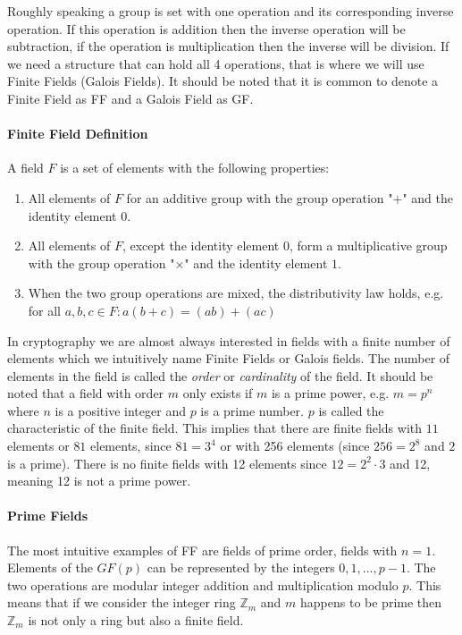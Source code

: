 Roughly speaking a group is set with one operation and its corresponding inverse operation. If this operation is addition then the inverse operation will be subtraction, if the operation is multiplication then the inverse will be division. If we need a structure that can hold all 4 operations, that is where we will use Finite Fields (Galois Fields). It should be noted that it is common to denote a Finite Field as FF and a Galois Field as GF. 

\paragraph{Finite Field Definition}

A field $F$ is a set of elements with the following properties:

\begin{enumerate}
\item{All elements of $F$ for an additive group with the group operation "$+$" and the identity element $0$.}
\item{All elements of $F$, except the identity element $0$, form a multiplicative group with the group operation "$\times$" and the identity element $1$.}
\item{When the two group operations are mixed, the distributivity law holds, e.g. for all $a,b,c \in F : a(b + c) = (ab) + (ac)$} 
\end{enumerate}

In cryptography we are almost always interested in fields with a finite number of elements which we intuitively name Finite Fields or Galois fields. The number of elements in the field is called the \textit{order} or \textit{cardinality} of the field. It should be noted that a field with order $m$ only exists if $m$ is a prime power, e.g. $m = p^n$ where $n$ is a positive integer and $p$ is a prime number. $p$ is called the characteristic of the finite field. This implies that there are finite fields with $11$ elements or $81$ elements, since $81 = 3^4$ or with 256 elements (since $256 = 2^8$ and $2$ is a prime). There is no finite fields with 12 elements since $12 = 2^2 \cdot 3$ and 12, meaning 12 is not a prime power.

\paragraph{Prime Fields}

The most intuitive examples of FF are fields of prime order, fields with $n=1$. Elements of the $GF(p)$ can be represented by the integers $0,1,...,p-1$. The two operations are modular integer addition and multiplication modulo $p$. This means that if we consider the integer ring $\mathbb{Z}_m$ and $m$ happens to be prime then $\mathbb{Z}_m$ is not only a ring but also a finite field.

